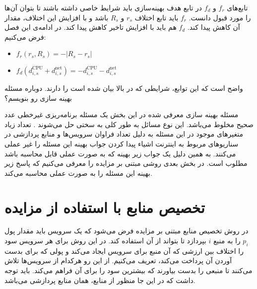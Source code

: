     تابع‌های $f_r$ و $f_d$ در تابع هدف بهینه‌سازی باید شرایط خاصی داشته باشند تا بتوان آن‌ها را مورد قبول دانست.
    $f_r$ باید تابع اختلاف $r_s$ و $R_s$ باشد و با افزایش این اختلاف، مقدار آن کاهش پیدا کند.
    $f_d$ هم باید با افزایش تاخیر‌ کاهش پیدا کند.
    در ادامه‌ی این فصل فرض می‌کنیم:
    \begin{latin}
      \begin{itemize}
        \item $f_r(r_s, R_s) = -|R_s - r_s|$
        \item $f_d(d^\text{CPU}_{i,s} + d^\text{net}_{i,s}) = - d^\text{CPU}_{i,s} - d^\text{net}_{i,s}$
      \end{itemize}
    \end{latin}
    واضح است که این توابع، شرایطی که در بالا بیان شده است را دارند.
    {دوباره مسئله بهینه سازی رو بنویسم؟}

    مسئله بهینه سازی معرفی شده در این بخش یک مسئله برنامه‌ریزی غیرخطی عدد صحیح مخلوط  می‌باشد.
    این نوع مسائل به طور کلی به سختی حل می‌شوند \cite{bertsimas1997introduction}.
    تعداد زیاد متغیر‌های موجود در این مسئله به دلیل تعداد فراوان سرویس‌ها و منابع پردازشی در سناریو‌های مربوط به اینترنت اشیاء پیدا کردن جواب بهینه این مسئله را غیر عملی می‌کنند.
    به همین دلیل یک جواب زیر بهینه که به صورت عملی قابل محاسبه باشد مطلوب است.
    در بخش بعدی روشی مبتنی بر مزایده را معرفی می‌کنیم که پاسخ زیر بهینه این مسئله را به صورت عملی محاسبه می‌کند.

  \section{تخصیص منابع با استفاده از مزایده}
    در روش‌ تخصیص منابع مبتنی بر مزایده فرض می‌شود که یک سرویس باید مقدار پول $p_i$ را به منبع $i$ بپردازد تا بتواند از آن استفاده کند.
    در این روش برای هر سرویس سود را اختلاف بین ارزشی که آن منبع برای سرویس ایجاد می‌کند و پولی که برای بدست آوردن آن پرداخت می‌کند، تعریف می‌کنیم.
    از این رو هرکدام از سرویس‌ها تلاش می‌کنند تا منبعی را بدست بیاورند که بیشترین سود را برای آن‌ فراهم می‌کند.
    باید توجه داشت که در این جا منظور از منابع، همان منابع پردازشی می‌باشد.
